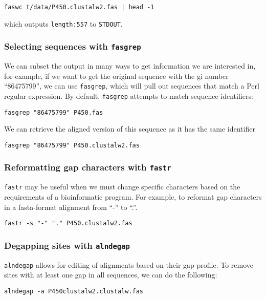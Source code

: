 \documentclass[11pt]{article}
\begin{document}
\begin{verbatim}
faswc t/data/P450.clustalw2.fas | head -1
\end{verbatim}

which outputs \texttt{length:557} to \texttt{STDOUT}.
\subsubsection{Selecting sequences with \texttt{fasgrep}}
\label{sec-2_3_2}


We can subset the output in many ways to get information we are
interested in, for example, if we want to get the original sequence
with the gi number ``86475799'', we can use \texttt{fasgrep}, which will pull
out sequences that match a Perl regular expression. By default,
\texttt{fasgrep} attempts to match sequence identifiers:

\begin{verbatim}
fasgrep "86475799" P450.fas
\end{verbatim}

We can retrieve the aligned version of this sequence as it has the
same identifier

\begin{verbatim}
fasgrep "86475799" P450.clustalw2.fas
\end{verbatim}
\subsubsection{Reformatting gap characters with \texttt{fastr}}
\label{sec-2_3_3}


\texttt{fastr} may be useful when we must change specific characters based on
the requirements of a bioinformatic program. For example, to reformat
gap characters in a fasta-format alignment from ``-'' to ``.''.

\begin{verbatim}
fastr -s "-" "." P450.clustalw2.fas
\end{verbatim}
\subsubsection{Degapping sites with \texttt{alndegap}}
\label{sec-2_3_4}


\texttt{alndegap} allows for editing of alignments based on their gap
profile. To remove sites with at least one gap in all sequences, we
can do the following:

\begin{verbatim}
alndegap -a P450clustalw2.clustalw.fas
\end{verbatim}
\end{document}
